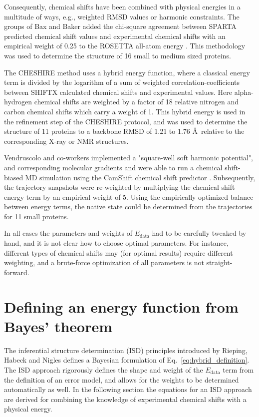 Consequently, chemical shifts have been combined with physical energies in a multitude of ways, e.g., weighted RMSD values or harmonic constraints.
The groups of Bax and Baker added the chi-square agreement between SPARTA predicted chemical shift values and experimental chemical shifts with an empirical weight of 0.25 to the ROSETTA all-atom energy \cite{BakerBax}. This methodology was used to determine the structure of 16 small to medium sized proteins.

The CHESHIRE method \cite{cheshire} uses a hybrid energy function, where a classical energy term is divided by the logarithm of a sum of weighted correlation-coefficients between SHIFTX calculated chemical shifts and experimental values.
Here alpha-hydrogen chemical shifts are weighted by a factor of 18 relative nitrogen and carbon chemical shifts which carry a weight of 1.
This hybrid energy is used in the refinement step of the CHESHIRE protocol, and was used to determine the structure of 11 proteins to a backbone RMSD of 1.21 to 1.76 \AA~relative to the corresponding X-ray or NMR structures.

Vendruscolo and co-workers implemented a "square-well soft harmonic potential", and corresponding molecular gradients and were able to run a chemical shift-biased MD simulation using the CamShift chemical shift predictor \cite{CSMD}. Subsequently, the trajectory snapshots were re-weighted by multiplying the chemical shift energy term by an empirical weight of 5.
Using the empirically optimized balance between energy terms, the native state could be determined from the trajectories for 11 small proteins.

In all cases the parameters and weights of $E_{\mathrm{data}}$ had to be carefully tweaked by hand, and it is not clear how to choose optimal parameters.
For instance, different types of chemical shifts may (for optimal results) require different weighting, and a brute-force optimization of all parameters is not straight-forward.

\section{Defining an energy function from Bayes' theorem}
The inferential structure determination (ISD) principles introduced by Rieping, Habeck and Nigles \cite{Rieping2005} defines a Bayesian formulation of Eq.~\ref{eq:hybrid_definition}.
The ISD approach rigorously defines the shape and weight of the $E_{\mathrm{data}}$ term from the definition of an error model, and allows for the weights to be determined automatically as well. In the following section the equations for an ISD approach are derived for combining the knowledge of experimental chemical shifts with a physical energy.

